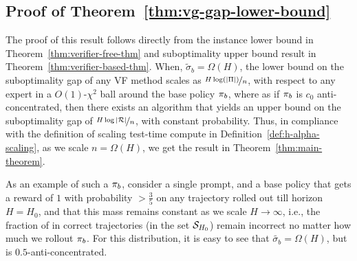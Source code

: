 \subsection{Proof of Theorem~\ref{thm:vg-gap-lower-bound}}
\label{subsec:proof-vg-gap-lower-bound}

The proof of this result follows directly from the instance lower bound in Theorem~\ref{thm:verifier-free-thm} and suboptimality upper bound result in Theorem~\ref{thm:verifier-based-thm}. When, $\tilde{\sigma}_b =  \Omega(H)$, the lower bound on the suboptimality gap of any VF method scales as $\nicefrac{H\log(|\Pi|)}{n}$, with respect to any expert in a $O(1)$-$\chi^2$ ball around the base policy $\pi_b$, where as if $\pi_b$ is $c_0$ anti-concentrated, then there exists an algorithm that yields an upper bound on the suboptimality gap of $\nicefrac{H\log|{\mathcal{R}}|}{n}$, with constant probability. Thus, in compliance with the definition of scaling test-time compute in Definition~\ref{def:h-alpha-scaling}, as we scale $n=\Omega(H)$, we get the result in Theorem~\ref{thm:main-theorem}.


As an example of such a $\pi_b$, consider a single prompt, and a base policy that gets a reward of $1$ with probability $> \frac{3}{5}$ on any trajectory rolled out till horizon $H=H_0$, and that this mass remains constant as we scale $H \rightarrow \infty$, i.e., the fraction of in correct trajectories (in the set ${\mathcal{S}}_{H_0}$) remain incorrect no matter how much we rollout $\pi_b$. For this distribution, it is easy to see that $\widetilde{\sigma_b} = \Omega(H)$, but is $0.5$-anti-concentrated. 
